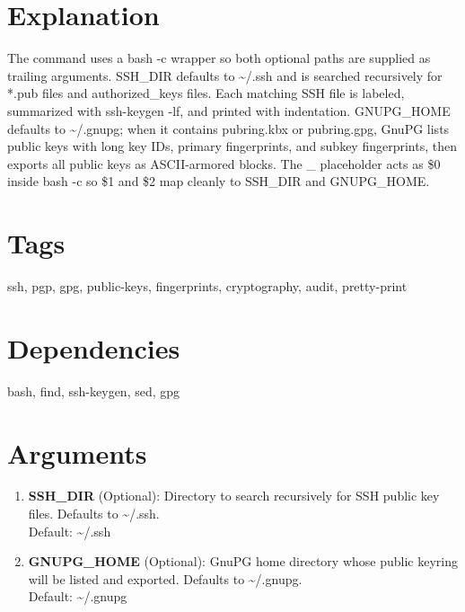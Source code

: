 \documentclass[openany]{book}
\begin{document}
\section*{Explanation}
The command uses a bash -c wrapper so both optional paths are supplied as trailing arguments. SSH\_DIR defaults to \textasciitilde{}/.ssh and is searched recursively for *.pub files and authorized\_keys files. Each matching SSH file is labeled, summarized with ssh-keygen -lf, and printed with indentation. GNUPG\_HOME defaults to \textasciitilde{}/.gnupg; when it contains pubring.kbx or pubring.gpg, GnuPG lists public keys with long key IDs, primary fingerprints, and subkey fingerprints, then exports all public keys as ASCII-armored blocks. The \_ placeholder acts as \$0 inside bash -c so \$1 and \$2 map cleanly to SSH\_DIR and GNUPG\_HOME.

\section*{Tags}
ssh, pgp, gpg, public-keys, fingerprints, cryptography, audit, pretty-print

\section*{Dependencies}
bash, find, ssh-keygen, sed, gpg


\section*{Arguments}
\begin{enumerate}
  \item \textbf{SSH\_DIR} (Optional): Directory to search recursively for SSH public key files. Defaults to \textasciitilde{}/.ssh. \\ Default: \textasciitilde{}/.ssh
  \item \textbf{GNUPG\_HOME} (Optional): GnuPG home directory whose public keyring will be listed and exported. Defaults to \textasciitilde{}/.gnupg. \\ Default: \textasciitilde{}/.gnupg
\end{enumerate}
\end{document}
